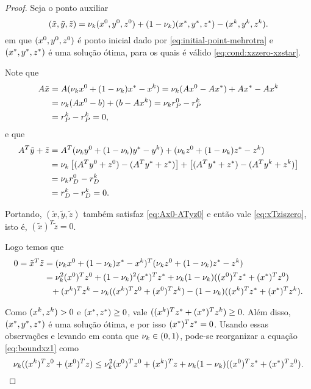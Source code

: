 \begin{proof}
	Seja o ponto auxiliar
	\[
		(\tilde{x},\tilde{y},\tilde{z})  = \nu_{k} (x^0,y^0,z^0) + (1-\nu_{k} )(x^*,y^*,z^*) - (x^{k},y^{k},z^{k}). 
	\]
em que $(x^0,y^0,z^0)$ é ponto inicial dado por \eqref{eq:initial-point-mehrotra} e $(x^*,y^*,z^*)$ é  uma solução ótima, para os quais é válido \eqref{eq:cond:xzzero-xzstar}.


Note que 
\[
\begin{aligned}
A\tilde{x} & = A(\nu_{k} x^0+ (1-\nu_{k} )x^* -x^{k}) = \nu_{k} (Ax^0 - Ax^*) + Ax^* - Ax^{k}   \\
& = \nu_{k} (Ax^0 - b) + (b - Ax^{k}) = \nu_{k}  r_{P}^{0} - r_{P}^{k}  \\
 & = r_{P}^{k} - r_{P}^{k} = 0,  
\end{aligned}
\]
e que
\[
\begin{aligned}
A^{T}\tilde{y} + \tilde{z}  & = 	A^{T}(\nu_{k} y^0 + (1-\nu_{k} )y^* - y^{k}) + (\nu_{k} z^0 + (1-\nu_{k} )z^* - z^{k}) \\
							&  =  \nu_{k}  \left[(A^{T}y^0  +z^0)  - (A^{T}y^*  +z^*)  \right]+  \left[(A^{T}y^*  +z^*)  - (A^{T}y^{k}  +z^{k})  \right]  \\
							& = \nu_{k}  r_{D}^{0} - r_{D}^{k}  \\
 & = r_{D}^{k} - r_{D}^{k} = 0.   
\end{aligned}
\]


Portando, $(\tilde{x},\tilde{y},\tilde{z})$ também satisfaz \eqref{eq:Ax0-ATyz0} e então vale \eqref{eq:xTziszero}, isto é, $(\tilde{x})^{T}\tilde{z} = 0$. 

Logo temos que 
\begin{align}
	0  = \tilde{x}^{T}\tilde{z} & = (\nuk \xzero + (1-\nuk )\xstar -\xk)^{T}(\nuk \zzero + (1-\nuk )\zstar -\zk)\notag\\
	  & = \nuk ^{2}(\xzero)^T\zzero + (1-\nuk )^{2}(\xstar)^{T}\zstar + \nuk (1-\nuk )((\xzero)^{T}\zstar + (\xstar)^{T}\zzero) \notag\\
	  & \textcolor{white}{=} +(\xk)^{T}\zk - \nuk  ((\xk)^{T}\zzero + (\xzero)^{T}\zk) - (1-\nuk ) ((\xk)^{T}\zstar + (\xstar)^{T}\zk).\label{eq:boundxz1}
\end{align}

Como  $(x^{k},z^{k})>0$ e $(x^*,z^*)\geq 0$, vale $((x^{k})^{T}z^* + (x^*)^{T}z^{k}) \geq 0$. Além disso, $(x^*,y^*,z^*)$ é uma solução ótima, e por isso $(x^*)^{T}z^* = 0$. Usando essas observações e levando em conta que $\nu_{k} \in(0,1)$,  pode-se reorganizar  a equação \eqref{eq:boundxz1} como
\begin{equation}
	\label{eq:xTzero+xzeroTz}
	  \nu_{k}  ((x^{k})^{T}z^0 + (x^0)^{T}z) \leq 
  \nu_{k} ^{2}(x^0)^Tz^0  + (x^{k})^{T}z+  \nu_{k} (1-\nu_{k} )((x^0)^{T}z^* + (x^*)^{T}z^0).
\end{equation}


\end{proof}
